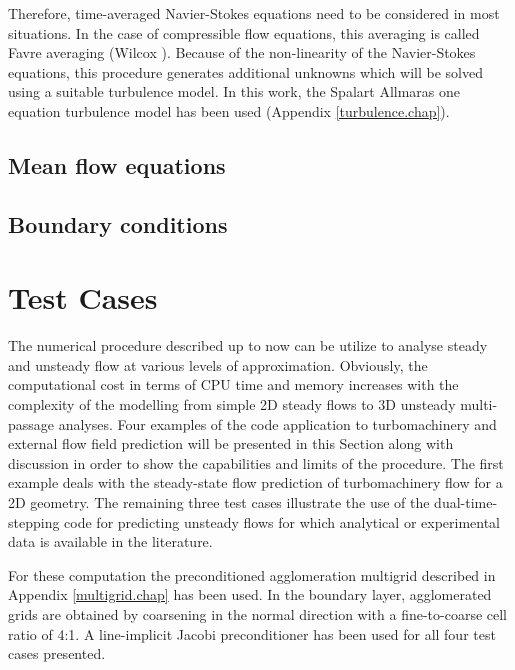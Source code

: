  Therefore, time-averaged Navier-Stokes equations need to be considered
 in most situations.
 In the case of compressible flow equations, this averaging
 is called Favre averaging (Wilcox ).
 Because of the non-linearity of the Navier-Stokes equations, this
 procedure generates additional unknowns which will be solved using a
 suitable turbulence model. 
 In this work, the Spalart Allmaras \citeyear{Spalart:1} one equation
 turbulence model has been used (Appendix \ref{turbulence.chap}).
%
%
%
%
\subsection{Mean flow equations}
\label{conservative_formulation.subsec}

%
\subsection{Boundary conditions}
\label{boundary_conditions_nonlinear.subsec}

%

%

%
%
%
\section{Test Cases}
\label{exemples_nonlinear.sec}
%
 The numerical procedure described up to now can be utilize to analyse
 steady and unsteady flow at various levels of approximation.
 Obviously, the computational cost in terms of CPU time and memory increases
 with the complexity of the modelling from simple 2D steady flows to 3D
 unsteady multi-passage analyses.
 Four examples of the code application to turbomachinery and external flow
 field prediction will be presented in this Section along with
 discussion in order to show the capabilities and limits of the
 procedure.
 The first example deals with the steady-state flow prediction of
 turbomachinery flow for a 2D geometry. The remaining three
 test cases illustrate the use of the dual-time-stepping code
 for predicting unsteady flows for which analytical or experimental
 data is available in the literature.

 For these computation the preconditioned agglomeration multigrid described
 in Appendix \ref{multigrid.chap} has been used.
 In the boundary layer, agglomerated grids are obtained by coarsening in
 the normal direction with a fine-to-coarse cell ratio of 4:1. A line-implicit
 Jacobi preconditioner has been used for all four test cases presented.
%
%

%
%
%

%

%

%
%
